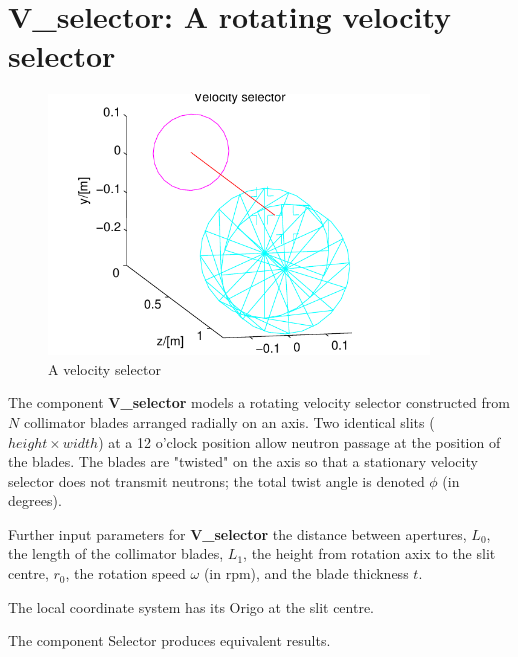 \section{V\_selector: A rotating velocity selector}
\label{vselector}


\begin{figure}
  \begin{center}
    \includegraphics[width=0.9\textwidth]{figures/vselector}
  \end{center}
\caption{A velocity selector}
\label{f:vselector}
\end{figure}

The component {\bf V\_selector} models a rotating velocity
selector constructed from $N$ collimator blades
arranged radially on an axis. Two identical slits ($height \times width$)
at a 12 o'clock position allow
neutron passage at the position of the blades.
The blades are "twisted" on the axis so that a stationary
velocity selector does not transmit neutrons; the total
twist angle is denoted $\phi$ (in degrees).

Further input parameters for {\bf V\_selector} 
the distance between apertures, $L_0$, the length of the
collimator blades, $L_1$, the height from rotation axix to the slit
centre, $r_0$, the rotation speed $\omega$ (in rpm), 
and the blade thickness $t$.

The local coordinate system has its Origo at the slit centre.

The component {\rm Selector} produces equivalent results.

